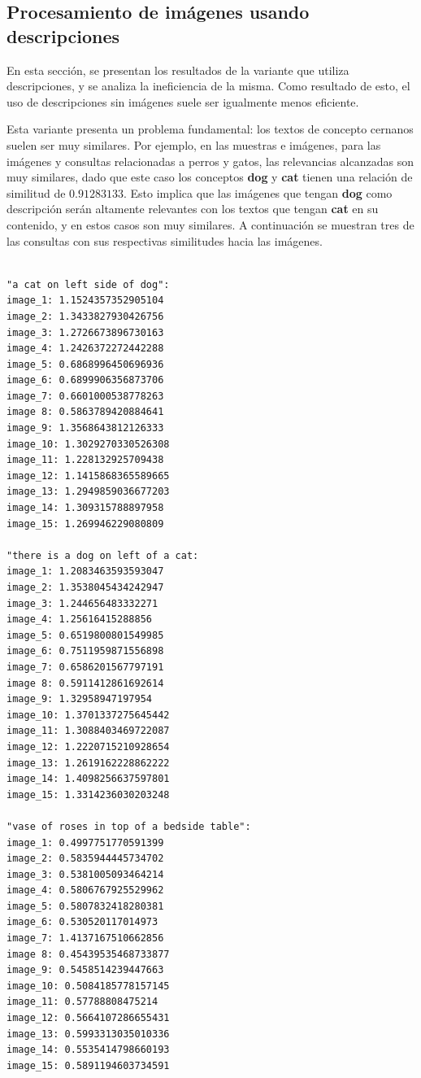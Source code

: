 \subsection{Procesamiento de im\'agenes usando descripciones}
En esta sección, se presentan los resultados de la variante que utiliza descripciones, y se analiza la ineficiencia de la misma. Como resultado de esto, el uso de descripciones sin im\'agenes suele ser igualmente menos eficiente.

Esta variante presenta un problema fundamental: los textos de concepto cernanos suelen ser muy similares. Por ejemplo, en las muestras e im\'agenes, para las im\'agenes y consultas relacionadas a perros y gatos, las relevancias alcanzadas son muy similares, dado que este caso los conceptos \textbf{dog} y \textbf{cat} tienen una relación de similitud de $0.91283133$. Esto implica que las im\'agenes que tengan \textbf{dog} como descripción ser\'an altamente relevantes con los textos que tengan \textbf{cat} en su contenido, y en estos casos son muy similares. A continuaci\'on se muestran tres de las consultas con sus respectivas similitudes hacia las im\'agenes.

\begin{verbatim}

"a cat on left side of dog":
image_1: 1.1524357352905104
image_2: 1.3433827930426756
image_3: 1.2726673896730163
image_4: 1.2426372272442288
image_5: 0.6868996450696936
image_6: 0.6899906356873706
image_7: 0.6601000538778263
image 8: 0.5863789420884641
image_9: 1.3568643812126333
image_10: 1.3029270330526308
image_11: 1.228132925709438
image_12: 1.1415868365589665
image_13: 1.2949859036677203
image_14: 1.309315788897958
image_15: 1.269946229080809

"there is a dog on left of a cat:
image_1: 1.2083463593593047
image_2: 1.3538045434242947
image_3: 1.244656483332271
image_4: 1.25616415288856
image_5: 0.6519800801549985
image_6: 0.7511959871556898
image_7: 0.6586201567797191
image 8: 0.5911412861692614
image_9: 1.32958947197954
image_10: 1.3701337275645442
image_11: 1.3088403469722087
image_12: 1.2220715210928654
image_13: 1.2619162228862222
image_14: 1.4098256637597801
image_15: 1.3314236030203248

"vase of roses in top of a bedside table":
image_1: 0.4997751770591399
image_2: 0.5835944445734702
image_3: 0.5381005093464214
image_4: 0.5806767925529962
image_5: 0.5807832418280381
image_6: 0.530520117014973
image_7: 1.4137167510662856
image 8: 0.45439535468733877
image_9: 0.5458514239447663
image_10: 0.5084185778157145
image_11: 0.57788808475214
image_12: 0.5664107286655431
image_13: 0.5993313035010336
image_14: 0.5535414798660193
image_15: 0.5891194603734591

\end{verbatim}

